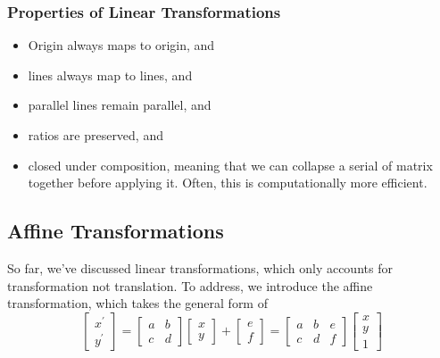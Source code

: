 \documentclass[11pt]{article}
\begin{document}
\subsubsection{Properties of Linear Transformations}
\begin{itemize}
	\item Origin always maps to origin, and 
	\item lines always map to lines, and 
	\item parallel lines remain parallel, and 
	\item ratios are preserved, and 
	\item closed under composition, meaning that we can collapse a serial of matrix together before applying it. Often, this is computationally more efficient. 
\end{itemize}

\subsection{Affine Transformations}
So far, we've discussed linear transformations, which only accounts for transformation not translation. To address, we introduce the affine transformation, which takes the general form of 
\begin{equation}
	\left[\begin{array}{l}
		x^{\prime} \\
		y^{\prime}
		\end{array}\right]=\left[\begin{array}{ll}
		a & b \\
		c & d
		\end{array}\right]\left[\begin{array}{l}
		x \\
		y
		\end{array}\right]+\left[\begin{array}{l}
		e \\
		f
	\end{array}\right] = \left[\begin{array}{lll}
		a & b & e \\
		c & d & f
		\end{array}\right]\left[\begin{array}{l}
		x \\
		y \\
		1 
	\end{array}\right]
\end{equation}
\end{document}
